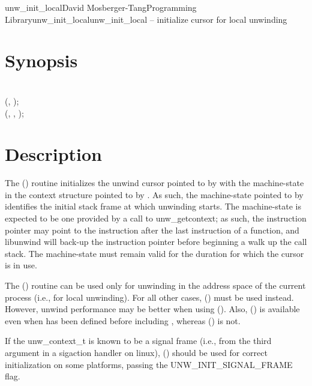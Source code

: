 \documentclass{article}
\begin{document}
\begin{Name}{3}{unw\_init\_local}{David Mosberger-Tang}{Programming Library}{unw\_init\_local}unw\_init\_local -- initialize cursor for local unwinding
\end{Name}

\section{Synopsis}

\\

 (, );\\
 (, ,  );\\

\section{Description}

The () routine initializes the unwind cursor
pointed to by  with the machine-state in the context structure
pointed to by .  As such, the machine-state pointed to by
 identifies the initial stack frame at which unwinding
starts.  The machine-state is expected to be one provided by a call to
unw_getcontext; as such, the instruction pointer may point to the
instruction after the last instruction of a function, and libunwind
will back-up the instruction pointer before beginning a walk up the
call stack.  The machine-state must remain valid for the duration for
which the cursor  is in use.

The () routine can be used only for unwinding in
the address space of the current process (i.e., for local unwinding).
For all other cases, () must be used instead.
However, unwind performance may be better when using
().  Also, () is
available even when  has been defined before
including , whereas ()
is not.

If the unw_context_t is known to be a signal frame (i.e., from the
third argument in a sigaction handler on linux),
() should be used for correct initialization
on some platforms, passing the UNW_INIT_SIGNAL_FRAME flag.
\end{document}
